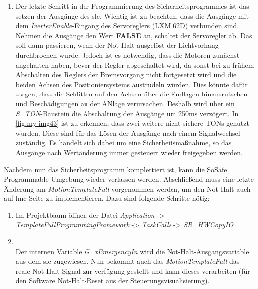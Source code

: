 \documentclass[../../../Bachelorarbeit.tex]{subfiles}
\begin{document}
\begin{enumerate}
    \item Der letzte Schritt in der Programmierung des Sicherheitsprogrammes ist das setzen der Ausgänge des \acs{slc}. Wichtig ist zu beachten, dass die Ausgänge mit dem \textit{IverterEnable}-Eingang des Servoreglers (LXM 62D) verbunden sind. Nehmen die Ausgänge den Wert \textbf{FALSE} an, schaltet der Servoregler ab. Das soll dann passieren, wenn der Not-Halt ausgelöst \bzw der Lichtvorhang durchbrochen wurde. Jedoch ist es notwendig, dass die Motoren zunächst angehalten haben, bevor der Regler abgeschaltet wird, da sonst bei zu frühem Abschalten des Reglers der Bremsvorgang nicht fortgesetzt wird und die beiden Achsen des Positioniersystems austrudeln würden. Dies könnte dafür sorgen, dass die Schlitten auf den Achsen über die Endlagen hinausrutschen und Beschädigungen an der ANlage verursachen. Deshalb wird über ein \textit{S\_TON}-Baustein die Abschaltung der Ausgänge um 250\si{ms} verzögert. In \autoref{fig:my-img43} ist zu erkennen, dass zwei weitere nicht-sichere TONs genutzt wurden. Diese sind für das Lösen der Ausgänge nach einem Signalwechsel zuständig. Es handelt sich dabei um eine Sicherheitsmaßnahme, so das Ausgänge nach Wertänderung immer gesteuert wieder freigegeben werden.
\end{enumerate}

Nachdem nun das Sicherheitsprogramm komplettiert ist, kann die SoSafe Programmable Umgebung wieder verlassen werden. Abschließend muss eine letzte Änderung am \textit{MotionTemplateFull} vorgenommen werden, um den Not-Halt auch auf \acs{lmc}-Seite zu implementieren. Dazu sind folgende Schritte nötig:

\begin{enumerate}
    \item Im Projektbaum öffnen der Datei \textit{Application} -> \textit{TemplateFullProgrammingFramework} -> \textit{TaskCalls} -> \textit{SR\_HWCopyIO}
    \item \begin{minipage}[t]{\linewidth}
        \raggedright
        \label{fig:my-img44}
    \end{minipage}
    \bigskip \\
    Der internen Variable \textit{G\_xEmergencyIn} wird die Not-Halt-Ausgangsvariable aus dem \acs{slc} zugewiesen. Nun bekommt auch das \textit{MotionTemplateFull} das reale Not-Halt-Signal zur verfügung gestellt und kann dieses verarbeiten (\zB für den Software Not-Halt-Reset aus der Steuerungsvisualisierung).
\end{enumerate}
\end{document}
